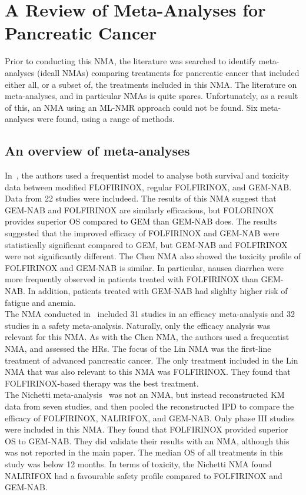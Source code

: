 \chapter{A Review of Meta-Analyses for Pancreatic Cancer}\label{litChap}
Prior to conducting this NMA, the literature was searched to identify meta-analyses (ideall NMAs) comparing treatments for pancreatic cancer that included either all, or a subset of, the treatments included in this NMA. The literature on meta-analyses, and in particular NMAs is quite spares. Unfortunately, as a result of this, an NMA using an ML-NMR approach could not be found. Six meta-analyses were found, using a range of methods.

\section{An overview of meta-analyses}
In~\cite{chen}, the authors used a frequentist model to analyse both survival and toxicity data between modified FLOFIRINOX, regular FOLFIRINOX, and GEM-NAB. Data from 22 studies were includeed. The results of this NMA suggest that GEM-NAB and FOLFIRINOX are similarly efficacious, but FOLORINOX provides superior OS compared to GEM than GEM-NAB does. The results suggested that the improved efficacy of FOLFIRINOX and GEM-NAB were statistically significant compared to GEM, but GEM-NAB and FOLFIRINOX were not significantly different. The Chen NMA also showed the toxicity profile of FOLFIRINOX and GEM-NAB is similar. In particular, nausea diarrhea were more frequently observed in patients treated with FOLFIRINOX than GEM-NAB. In addition, patients treated with GEM-NAB had slighlty higher risk of fatigue and anemia. \\

The NMA conducted in~\cite{lin} included 31 studies in an efficacy meta-analysis and 32 studies in a safety meta-analysis. Naturally, only the efficacy analysis was relevant for this NMA. As with the Chen NMA, the authors used a frequentist NMA, and assessed the HRs. The focus of the Lin NMA was the first-line treatment of advanced pancreatic cancer. The only treatment included in the Lin NMA that was also relevant to this NMA was FOLFIRINOX. They found that FOLFIRINOX-based therapy was the best treatment. \\

The Nichetti meta-analysis~\cite{nichetti} was not an NMA, but instead reconstructed KM data from seven studies, and then pooled the reconstructed IPD to compare the efficacy of FOLFIRINOX, NALIRIFOX, and GEM-NAB. Only phase III studies were included in this NMA. They found that FOLFIRINOX provided superior OS to GEM-NAB. They did validate their results with an NMA, although this was not reported in the main paper. The median OS of all treatments in this study was below 12 months. In terms of toxicity, the Nichetti NMA found NALIRIFOX had a favourable safety profile compared to FOLFIRINOX and GEM-NAB. \\

